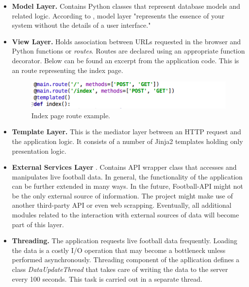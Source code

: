 \begin{itemize}
    \item \textbf{Model Layer.} Contains Python classes that represent database models and related logic. According to \cite{article:goodArchitecture}, model layer "represents the essence of your system without the details of a user interface."
    \item \textbf{View Layer.} Holds association between URLs requested in the browser and Python functions or \emph{routes}. Routes are declared using an appropriate function decorator. Below can be found an excerpt from the application code. This is an route representing the index page.

\begin{figure}[H]
    \begin{center}
        \includegraphics[width=.40\linewidth,natwidth=610,natheight=642]{impl/images/indexPageRoute}
        \caption{Index page route example.} \label{fig:using:indexPageRoute}
    \end{center}
\end{figure}     
        
    \item \textbf{Template Layer.} This is the mediator layer between an HTTP request and the application logic. It consists of a number of Jinja2 templates holding only     presentation logic. 
    \item \textbf{External Services Layer} \cite{article:goodArchitecture}. Contains API wrapper class that accesses and manipulates live football data. In general, the functionality of the application can be further extended in many ways. In the future, Football-API might not be the only external source of information. The project might make use of another third-party API or even web scrapping. Eventually, all additional modules related to the interaction with external sources of data will become part of this layer.
    \item \textbf{Threading.} The application requests live football data frequently. Loading the data is a costly I/O operation that may become a bottleneck unless performed asynchronously. Threading component of the apllication defines a class \emph{DataUpdateThread} that takes care of writing the data to the server every 100 seconds. This task is carried out in a separate thread. 
\end{itemize}

